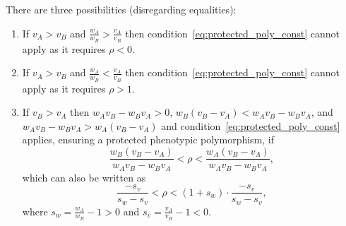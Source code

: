 \documentclass[12pt]{article} %
\begin{document}
There are three possibilities (disregarding equalities):
\begin{enumerate}
\item If $v_A > v_B$ and $\frac{w_A}{w_B} > \frac{v_A}{v_B}$ then condition~\eqref{eq:protected_poly_const} cannot apply as it requires $\rho<0$.
\item If $v_A > v_B$ and $\frac{w_A}{w_B} < \frac{v_A}{v_B}$ then condition~\eqref{eq:protected_poly_const} cannot apply as it requires $\rho>1$.
\item If $v_B > v_A$ then $w_A v_B - w_B v_A > 0$, $w_B(v_B - v_A)<w_A v_B - w_B v_A$, and $w_A v_B - w_B v_A > w_A(v_B - v_A)$ and condition~\eqref{eq:protected_poly_const} applies, ensuring a protected phenotypic polymorphism, if
\begin{equation}
\frac{w_B(v_B - v_A)}{w_A v_B - w_B v_A} < \rho < \frac{w_A(v_B - v_A)}{w_A v_B - w_B v_A},
\end{equation}
which can also be written as 
\begin{equation}
\frac{-s_v}{s_w-s_v} 
< \rho < 
(1+s_w) \cdot \frac{-s_v}{s_w-s_v},
\end{equation}
where $s_w=\frac{w_A}{w_B}-1>0$ and $s_v=\frac{v_A}{v_B}-1<0$.
\end{enumerate}



%

\end{document}
